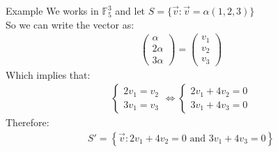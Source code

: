 \begin{parag}{Example}
    We works in $\mathbb{F}_5^3$ and let $S = \{ \vec{v}: \vec{v} = \alpha\left(1, 2, 3\right)\}$\\
    So we can write the vector as:
    \begin{align*} \begin{pmatrix} \alpha \\ 2\alpha \\ 3\alpha \end{pmatrix} = \begin{pmatrix} v_1 \\v_2  \\ v_3 \end{pmatrix}  \end{align*}
    Which implies that:
    \begin{align*}
        \begin{cases}
                2v_1 =  v_2\\
                3v_1 =  v_3
                \end{cases} \iff \begin{cases} 2v_1 + 4v_2 = 0\\ 3v_1 + 4v_3 = 0 \end{cases}
    \end{align*}
    Therefore:
    \begin{align*} 
        S' =  \left\{\vec{v}: 2v_1 + 4v_2 = 0 \text{ and } 3v_1 + 4v_3 = 0\right\}
    \end{align*}
\end{parag}

